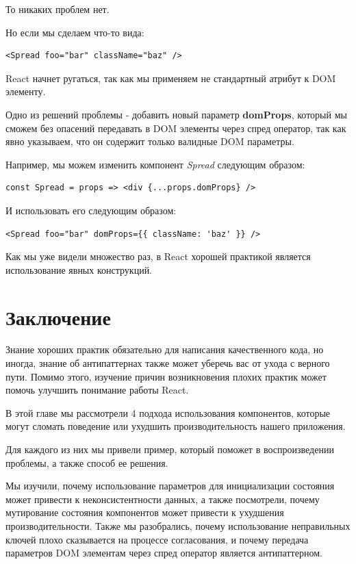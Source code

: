 То никаких проблем нет.

Но если мы сделаем что-то вида:

\begin{lstlisting}
<Spread foo="bar" className="baz" />
\end{lstlisting}

React начнет ругаться, так как мы применяем не стандартный атрибут к DOM элементу.

Одно из решений проблемы - добавить новый параметр \textbf{domProps}, который мы сможем без опасений передавать в DOM элементы через спред оператор, так как явно указываем, что он содержит только валидные DOM параметры.

Например, мы можем изменить компонент \textit{Spread} следующим образом:

\begin{lstlisting}
const Spread = props => <div {...props.domProps} />
\end{lstlisting}

И использовать его следующим образом:

\begin{lstlisting}
<Spread foo="bar" domProps={{ className: 'baz' }} />
\end{lstlisting}

Как мы уже видели множество раз, в React хорошей практикой является использование явных конструкций.

\section{Заключение}

Знание хороших практик обязательно для написания качественного кода, но иногда, знание об антипаттернах также может уберечь вас от ухода с верного пути. Помимо этого, изучение причин возникновения плохих практик может помочь улучшить понимание работы React.

В этой главе мы рассмотрели 4 подхода использования компонентов, которые могут сломать поведение или ухудшить производительность нашего приложения.

Для каждого из них мы привели пример, который поможет в воспроизведении проблемы, а также способ ее решения.

Мы изучили, почему использование параметров для инициализации состояния может привести к неконсистентности данных, а также посмотрели, почему мутирование состояния компонентов может привести к ухудшения производительности. Также мы разобрались, почему использование неправильных ключей плохо сказывается на процессе согласования, и почему передача параметров DOM элементам через спред оператор является антипаттерном.









